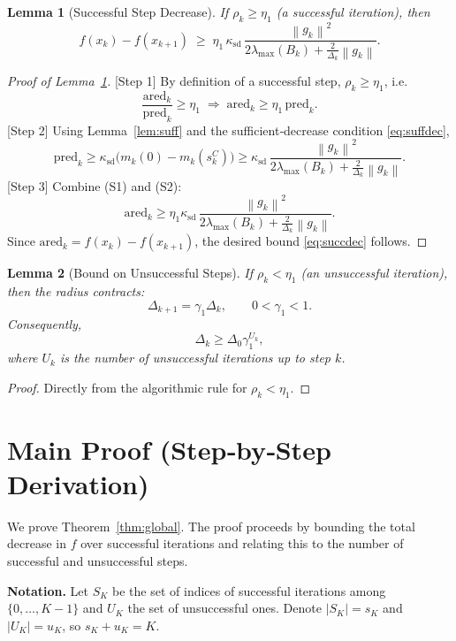 \documentclass{article}
\newtheorem{lemma}{Lemma}
\newcommand{\norm}[1]{\left\lVert#1\right\rVert}
\begin{document}
\begin{lemma}[Successful Step Decrease]\label{lem:succ}
If $\rho_{k}\ge\eta_{1}$ (a \emph{successful} iteration), then
\begin{equation}
\label{eq:succdec}
f(x_{k})-f(x_{k+1})\;\ge\;
\eta_{1}\,\kappa_{\mathrm{sd}}\,
\frac{\norm{g_{k}}^{2}}{2\lambda_{\max}(B_{k})+\frac{2}{\Delta_{k}}\norm{g_{k}}}.
\end{equation}
\end{lemma}
\begin{proof}[Proof of Lemma~\ref{lem:succ}]
[Step 1] By definition of a successful step, $\rho_{k}\ge\eta_{1}$, i.e.
\[
\frac{\text{ared}_{k}}{\text{pred}_{k}}\ge\eta_{1}
\;\Longrightarrow\;
\text{ared}_{k}\ge\eta_{1}\,\text{pred}_{k}.
\tag{S1}
\]
[Step 2] Using Lemma~\ref{lem:suff} and the sufficient‑decrease condition \eqref{eq:suffdec},
\[
\text{pred}_{k}\ge\kappa_{\mathrm{sd}}\bigl(m_{k}(0)-m_{k}(s_{k}^{C})\bigr)
\ge\kappa_{\mathrm{sd}}\,
\frac{\norm{g_{k}}^{2}}{2\lambda_{\max}(B_{k})+\frac{2}{\Delta_{k}}\norm{g_{k}}}.
\tag{S2}
\]
[Step 3] Combine (S1) and (S2):
\[
\text{ared}_{k}\ge\eta_{1}\kappa_{\mathrm{sd}}\,
\frac{\norm{g_{k}}^{2}}{2\lambda_{\max}(B_{k})+\frac{2}{\Delta_{k}}\norm{g_{k}}}.
\]
Since $\text{ared}_{k}=f(x_{k})-f(x_{k+1})$, the desired bound \eqref{eq:succdec} follows. \hfill\qedsymbol
\end{proof}

\begin{lemma}[Bound on Unsuccessful Steps]\label{lem:unsucc}
If $\rho_{k}<\eta_{1}$ (an \emph{unsuccessful} iteration), then the radius contracts:
\[
\Delta_{k+1}= \gamma_{1}\Delta_{k},\qquad 0<\gamma_{1}<1.
\]
Consequently,
\[
\Delta_{k}\ge\Delta_{0}\gamma_{1}^{U_{k}},
\]
where $U_{k}$ is the number of unsuccessful iterations up to step $k$.
\end{lemma}
\begin{proof}
Directly from the algorithmic rule for $\rho_{k}<\eta_{1}$. \hfill\qedsymbol
\end{proof}

\section*{Main Proof (Step‑by‑Step Derivation)}

We prove Theorem~\ref{thm:global}. The proof proceeds by bounding the total decrease in $f$ over successful iterations and relating this to the number of successful and unsuccessful steps.

\bigskip
\noindent\textbf{Notation.} Let $S_{K}$ be the set of indices of successful iterations among $\{0,\dots,K-1\}$ and $U_{K}$ the set of unsuccessful ones. Denote $|S_{K}|=s_{K}$ and $|U_{K}|=u_{K}$, so $s_{K}+u_{K}=K$.
\end{document}
